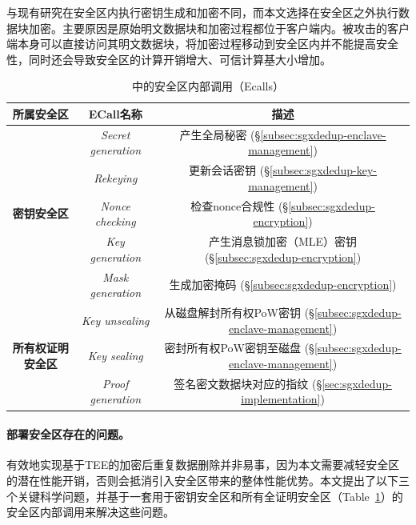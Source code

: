 与现有研究\cite{kim2019ShieldStore,fuhry20,djoko2019NEXUS}在安全区内执行密钥生成和加密不同，而本文选择在安全区之外执行数据块加密。主要原因是原始明文数据块和加密过程都位于客户端内。被攻击的客户端本身可以直接访问其明文数据块，将加密过程移动到安全区内并不能提高安全性，同时还会导致安全区的计算开销增大、可信计算基大小增加。

\begin{table}[!htb]
  \small
  \centering
  \begin{tabular}{ccc}
  \toprule
  {\bf 所属安全区} & {\bf ECall名称} & {\bf 描述}\\ 
  \midrule
  \multirow{5}{*}{\bf 密钥安全区}
  & \textit{ Secret generation} & 产生全局秘密 
  (\S\ref{subsec:sgxdedup-enclave-management}) \\
  & \textit{ Rekeying} & 更新会话密钥 
  (\S\ref{subsec:sgxdedup-key-management}) \\
  & \textit{ Nonce checking} & 检查nonce合规性 
  (\S\ref{subsec:sgxdedup-encryption}) \\
  & \textit{ Key generation} & 产生消息锁加密（MLE）密钥 (\S\ref{subsec:sgxdedup-encryption}) \\
  & \textit{ Mask generation} & 生成加密掩码 (\S\ref{subsec:sgxdedup-encryption}) \\
  \hline
  \multirow{3}{*}{\bf 所有权证明安全区}
  & \textit{ Key unsealing} & 从磁盘解封所有权PoW密钥 (\S\ref{subsec:sgxdedup-enclave-management}) \\
  & \textit{ Key sealing} & 密封所有权PoW密钥至磁盘 (\S\ref{subsec:sgxdedup-enclave-management}) \\
  & \textit{ Proof generation} & 签名密文数据块对应的指纹 
  (\S\ref{sec:sgxdedup-implementation}) \\
  \bottomrule
  \end{tabular}
  \caption{\sysnameS 中的安全区内部调用（Ecalls）}
  \label{tab:sgxdedup-ecall}
\end{table}

\paragraph*{部署安全区存在的问题。}有效地​​实现基于TEE的加密后重复数据删除并非易事，因为本文需要减轻安全区的潜在性能开销，否则会抵消引入安全区带来的整体性能优势。本文提出了以下三个关键科学问题，并基于一套用于密钥安全区和所有全证明安全区（Table~\ref{tab:sgxdedup-ecall}）的安全区内部调用来解决这些问题。

